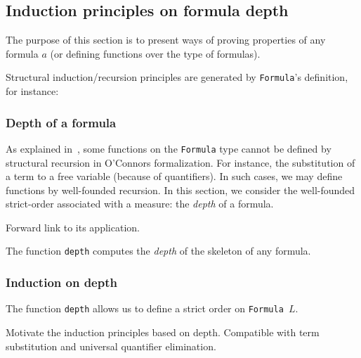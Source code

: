 \subsection{Induction principles on formula depth}

The purpose of this section is to present ways of proving 
properties of any formula $a$ (or defining functions over the type of formulas).

Structural induction/recursion principles are generated by 
\texttt{Formula}'s definition, for instance:








\subsubsection{Depth of a formula}
As explained in~\cite{OConnor05}, some functions on the \texttt{Formula} type cannot be defined by structural recursion in 
O'Connors formalization. For instance, the substitution of a term to a free variable (because of quantifiers). 
In such cases, we may define functions by well-founded recursion. In this section, we consider the well-founded strict-order associated with a measure: the \emph{depth} of a formula.

\begin{todo}
Forward link to its application.
\end{todo}


The function \texttt{depth} computes the \emph{depth} of the 
 skeleton of any formula.


\subsubsection{Induction on depth}

The function \texttt{depth} allows us to define a strict order on 
\texttt{Formula $L$}.



\begin{todo}
Motivate the induction principles based on depth. Compatible with term substitution and universal quantifier elimination.
\end{todo}



